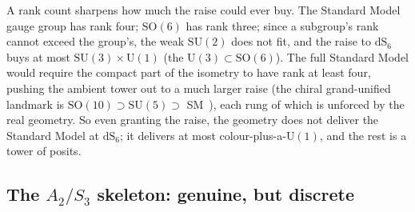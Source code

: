 \documentclass[11pt]{article}
\theoremstyle{plain}
\theoremstyle{remark}
\newcommand{\dS}{\mathrm{dS}}
\newcommand{\SO}{\mathrm{SO}}
\newcommand{\SU}{\mathrm{SU}}
\begin{document}
A rank count sharpens how much the raise could ever buy. The Standard Model gauge group has rank four; $\SO(6)$ has rank three; since a subgroup's rank cannot exceed the group's, the weak $\SU(2)$ does not fit, and the raise to $\dS_6$ buys at most $\SU(3)\times\mathrm{U}(1)$ (the $\mathrm{U}(3)\subset\SO(6)$). The full Standard Model would require the compact part of the isometry to have rank at least four, pushing the ambient tower out to a much larger raise (the chiral grand-unified landmark is $\SO(10)\supset\SU(5)\supset$ SM~\cite{GeorgiGlashow1974,FritzschMinkowski1975}), each rung of which is unforced by the real geometry. So even granting the raise, the geometry does not deliver the Standard Model at $\dS_6$; it delivers at most colour-plus-a-$\mathrm{U}(1)$, and the rest is a tower of posits.

\subsection{The $A_2/S_3$ skeleton: genuine, but discrete}\label{sec:a2}
\end{document}
